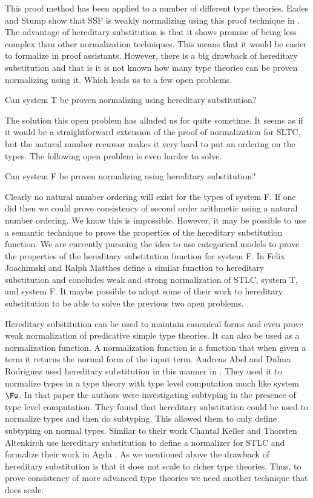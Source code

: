 This proof method has been applied to a number of different type
theories.  Eades and Stump show that SSF is weakly normalizing using
this proof technique in \cite{Eades:2010}.  The advantage of
hereditary substitution is that it shows promise of being less complex
than other normalization techniques.  This means that it would be
easier to formalize in proof assistants.  However, there is a big
drawback of hereditary substitution and that is it is not known how
many type theories can be proven normalizing using it.  Which leads us
to a few open problems.
\begin{openproblem}
  Can system T be proven normalizing using hereditary substitution?
\end{openproblem}
\noindent
The solution this open problem has alluded us for quite
sometime.  It seems as if it would be a straightforward extension of
the proof of normalization for SLTC, but the natural number recursor
makes it very hard to put an ordering on the types.  The following
open problem is even harder to solve.
\begin{openproblem}
  Can system F be proven normalizing using hereditary substitution?
\end{openproblem}
\noindent
Clearly no natural number ordering will exist for the types of system
F.  If one did then we could prove consistency of second order
arithmetic using a natural number ordering.  We know this is
impossible.  However, it may be possible to use a semantic technique
to prove the properties of the hereditary substitution function.  We
are currently pursuing the idea to use categorical models to prove the
properties of the hereditary substitution function for system F.  In
\cite{Joachimski:1999} Felix Joachimski and Ralph Matthes define a
similar function to hereditary substitution and concludes weak and
strong normalization of STLC, system T, and system F.  It maybe
possible to adopt some of their work to hereditary substitution to be
able to solve the previous two open problems.

Hereditary substitution can be used to maintain canonical forms and
even prove weak normalization of predicative simple type theories.  It
can also be used as a normalization function.  A normalization
function is a function that when given a term it returns the normal
form of the input term.  Andreas Abel and Dulma Rodriguez used
hereditary substitution in this manner in \cite{Abel:2008}.  They used
it to normalize types in a type theory with type level computation
much like system $\Fw$.  In that paper the authors were investigating
subtyping in the presence of type level computation.  They found that
hereditary substitution could be used to normalize types and then do
subtyping.  This allowed them to only define subtyping on normal
types.  Similar to their work Chantal Keller and Thorsten Altenkirch
use hereditary substitution to define a normalizer for STLC and
formalize their work in Agda \cite{Keller:2010}.
As we mentioned above the drawback of hereditary substitution is that
it does not scale to richer type theories.  Thus, to prove consistency
of more advanced type theories we need another technique that does
scale.

